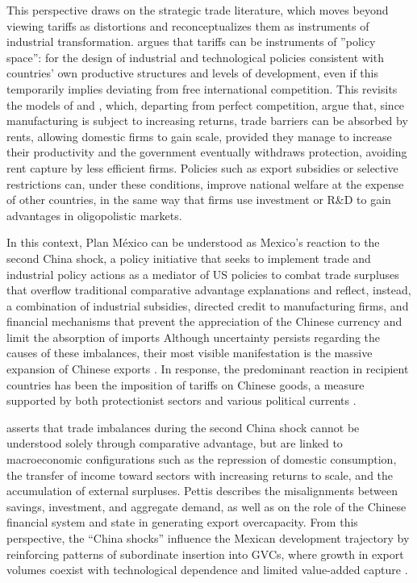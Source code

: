 \documentclass[11pt]{article}
\begin{document}
This perspective draws on the strategic trade literature, which moves beyond viewing tariffs as distortions and reconceptualizes them as instruments of industrial transformation. \citet{Rodrik2011} argues that tariffs can be instruments of ''policy
space'': for the design of industrial and technological policies
consistent with countries' own productive structures and levels of
development, even if this temporarily implies deviating from free
international competition. This revisits the models of
\citet{Krugman1983} and \citet{BranderSpencer1984,BranderSpencer1985,EatonGrossman1986}, which, departing
from perfect competition, argue that, since manufacturing is subject to
increasing returns, trade barriers can be absorbed by rents, allowing
domestic firms to gain scale, provided they manage to increase their
productivity and the government eventually withdraws protection, avoiding
rent capture by less efficient firms. Policies such as export subsidies
or selective restrictions can, under these conditions, improve national
welfare at the expense of other countries, in the same way that firms use
investment or R\&D to gain advantages in oligopolistic markets.

In this context, Plan México can be understood as Mexico's reaction to the second China shock, a policy initiative that seeks to implement trade and industrial policy actions as a mediator of US policies to combat trade surpluses that overflow traditional comparative advantage explanations and reflect, instead, a combination of industrial subsidies, directed credit to manufacturing firms, and financial mechanisms that prevent the appreciation of the Chinese currency and limit the absorption of imports
Although uncertainty persists regarding the causes of these imbalances, their most visible manifestation is the
massive expansion of Chinese exports \citep{Autor2016,Autor2021}. In response, the predominant reaction in recipient countries has been the imposition
of tariffs on Chinese goods, a measure supported by both protectionist
sectors and various political currents \citep{Freund2024}.

\citet{Pettis2024} asserts that trade imbalances during the second China shock cannot be understood solely through
comparative advantage, but are linked to macroeconomic configurations
such as the repression of domestic consumption, the transfer of income
toward sectors with increasing returns to scale, and the accumulation of
external surpluses. Pettis describes the misalignments
between savings, investment, and aggregate demand, as well as on the role
of the Chinese financial system and state in generating export
overcapacity. From this perspective, the ``China shocks'' influence the Mexican development trajectory by reinforcing
patterns of subordinate insertion into GVCs, where growth in export
volumes coexist with technological dependence and limited value-added capture \citep{OropezaGarcia2024}.
\end{document}
